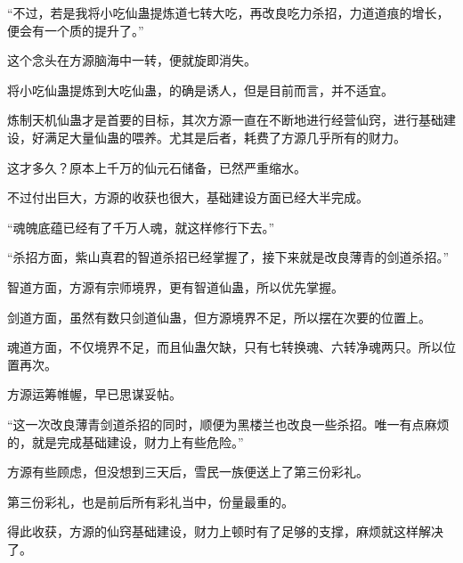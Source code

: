 \begin{this_body}
“不过，若是我将小吃仙蛊提炼道七转大吃，再改良吃力杀招，力道道痕的增长，便会有一个质的提升了。”

这个念头在方源脑海中一转，便就旋即消失。

将小吃仙蛊提炼到大吃仙蛊，的确是诱人，但是目前而言，并不适宜。

炼制天机仙蛊才是首要的目标，其次方源一直在不断地进行经营仙窍，进行基础建设，好满足大量仙蛊的喂养。尤其是后者，耗费了方源几乎所有的财力。

这才多久？原本上千万的仙元石储备，已然严重缩水。

不过付出巨大，方源的收获也很大，基础建设方面已经大半完成。

“魂魄底蕴已经有了千万人魂，就这样修行下去。”

“杀招方面，紫山真君的智道杀招已经掌握了，接下来就是改良薄青的剑道杀招。”

智道方面，方源有宗师境界，更有智道仙蛊，所以优先掌握。

剑道方面，虽然有数只剑道仙蛊，但方源境界不足，所以摆在次要的位置上。

魂道方面，不仅境界不足，而且仙蛊欠缺，只有七转换魂、六转净魂两只。所以位置再次。

方源运筹帷幄，早已思谋妥帖。

“这一次改良薄青剑道杀招的同时，顺便为黑楼兰也改良一些杀招。唯一有点麻烦的，就是完成基础建设，财力上有些危险。”

方源有些顾虑，但没想到三天后，雪民一族便送上了第三份彩礼。

第三份彩礼，也是前后所有彩礼当中，份量最重的。

得此收获，方源的仙窍基础建设，财力上顿时有了足够的支撑，麻烦就这样解决了。

\end{this_body}

